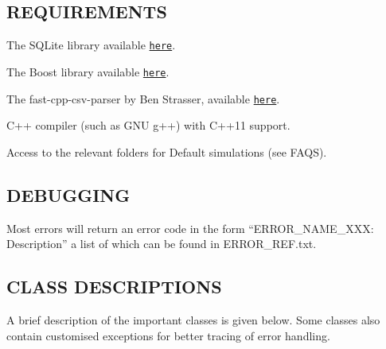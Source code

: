 \subsection*{R\+E\+Q\+U\+I\+R\+E\+M\+E\+N\+TS}


\begin{DoxyItemize}
\item The S\+Q\+Lite library available \href{https://www.sqlite.org/download.html}{\tt here}.
\item The Boost library available \href{http://www.boost.org}{\tt here}.
\item The fast-\/cpp-\/csv-\/parser by Ben Strasser, available \href{https://github.com/ben-strasser/fast-cpp-csv-parser}{\tt here}.
\item C++ compiler (such as G\+NU g++) with C++11 support.
\item Access to the relevant folders for Default simulations (see F\+A\+QS).
\end{DoxyItemize}

\subsection*{D\+E\+B\+U\+G\+G\+I\+NG}

Most errors will return an error code in the form “\+E\+R\+R\+O\+R\+\_\+\+N\+A\+M\+E\+\_\+\+X\+XX\+: Description” a list of which can be found in E\+R\+R\+O\+R\+\_\+\+R\+E\+F.\+txt.

\subsection*{C\+L\+A\+SS D\+E\+S\+C\+R\+I\+P\+T\+I\+O\+NS}

A brief description of the important classes is given below. Some classes also contain customised exceptions for better tracing of error handling.


